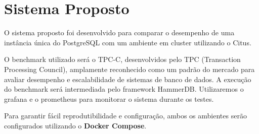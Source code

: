 \section{Sistema Proposto}

O sistema proposto foi desenvolvido para comparar o desempenho de uma instância única do PostgreSQL 
com um ambiente em cluster utilizando o Citus.

O benchmark utilizado será o TPC-C, desenvolvidos pelo TPC (Transaction Processing Council),
amplamente reconhecido como um padrão do mercado para avaliar desempenho e escalabilidade de sistemas 
de banco de dados. A execução do benchmark será intermediada pelo framework HammerDB.
Utilizaremos o grafana e o prometheus para monitorar o sistema durante os testes.

Para garantir fácil reprodutibilidade e configuração, 
ambos os ambientes serão configurados utilizando o \textbf{Docker Compose}.

